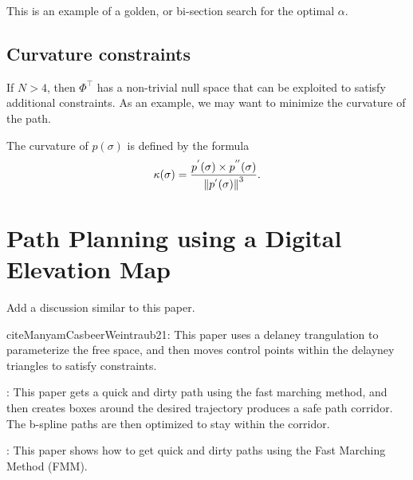 This is an example of a golden, or bi-section search for the optimal $\alpha$.
    


\subsection{Curvature constraints}


If $N>4$, then $\Phi^\top$ has a non-trivial null space that can be exploited to satisfy additional constraints.  As an example, we may want to minimize the curvature of the path.  

The curvature of $p(\sigma)$ is defined by the formula
\[
\kappa(\sigma) = \frac{p^{'}(\sigma)\times p^{''}(\sigma)}{\left\|p^{'}(\sigma)\right\|^3}.
\]


%


\section{Path Planning using a Digital Elevation Map}

Add a discussion similar to this paper.

cite{ManyamCasbeerWeintraub21}:  This paper uses a delaney trangulation to parameterize the free space, and then moves control points within the delayney triangles to satisfy constraints.


%

\cite{GaoWuLin18}:  This paper gets a quick and dirty path using the fast marching method, and then creates boxes around the desired trajectory produces a safe path corridor.  The b-spline paths are then optimized to stay within the corridor.
%


\cite{PetresPailhasPatron}:  This paper shows how to get quick and dirty paths using the Fast Marching Method (FMM).

